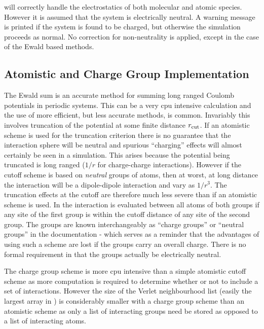\D{} will correctly handle the electrostatics of both molecular
and atomic species. However it is assumed that the system is
electrically neutral. A warning message is printed if the system is
found to be charged, but otherwise the simulation proceeds as normal.
No correction for non-neutrality is applied, except in the case of the 
Ewald based methods.

\subsection{Atomistic and Charge Group Implementation}

The Ewald sum is an accurate method for summing
long ranged
Coulomb potentials in periodic
systems. This can be a very cpu intensive calculation and the use of
more efficient, but less accurate methods, is common. Invariably this
involves truncation of the potential at some finite distance $r_{\rm
cut}$. If an atomistic scheme is used for the truncation criterion
there is no guarantee that the interaction sphere will be neutral and
spurious ``charging'' effects will almost certainly be seen in a
simulation.  This arises because the potential being truncated is
long ranged ($1/r$ for charge-charge interactions). However if the
cutoff scheme is based on {\em neutral} groups of atoms, then at
worst, at long distance the interaction will be a dipole-dipole
interaction and vary as $1/r^3$. The truncation effects at the cutoff
are therefore much less severe than if an atomistic scheme is used. In
\D{} the interaction is evaluated between all atoms of both groups if
any site of the first group is within the cutoff distance of any site
of the second group.  The groups are known interchangeably as ``charge
groups'' or ``neutral groups'' in the documentation - which serves as
a reminder that the advantages of using such a scheme are lost if the
groups carry an overall charge. There is no formal requirement in \D{}
that the groups actually be electrically neutral.

The charge group scheme is more cpu intensive than a simple atomistic
cutoff scheme as more computation is required to determine whether
or not to include a set of interactions. However the size of the
Verlet neighbourhood list (easily the largest array in \D{}) is
considerably smaller with a charge group scheme than an atomistic
scheme as only a list of interacting groups need be stored as opposed
to a list of interacting atoms.

